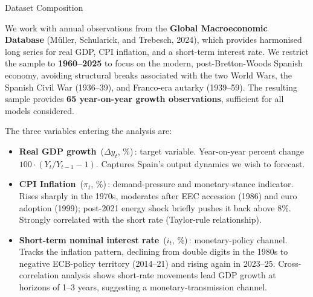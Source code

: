 \documentclass[9pt]{beamer}
\begin{document}
\begin{frame}{Dataset Composition}
\footnotesize

We work with annual observations from the \textbf{Global Macroeconomic Database} (Müller, Schularick, and Trebesch, 2024), which provides harmonised long series for real GDP, CPI inflation, and a short-term interest rate. We restrict the sample to \textbf{1960--2025} to focus on the modern, post-Bretton-Woods Spanish economy, avoiding structural breaks associated with the two World Wars, the Spanish Civil War (1936--39), and Franco-era autarky (1939--59). The resulting sample provides \textbf{65 year-on-year growth observations}, sufficient for all models considered.

\vspace{0.25cm}

The three variables entering the analysis are:
\begin{itemize}
  \item \textbf{Real GDP growth} \,($\Delta y_t$, \%)\,: target variable. Year-on-year percent change $100 \cdot (Y_t/Y_{t-1}-1)$. Captures Spain's output dynamics we wish to forecast.

  \item \textbf{CPI Inflation} \,($\pi_t$, \%)\,: demand-pressure and monetary-stance indicator. Rises sharply in the 1970s, moderates after EEC accession (1986) and euro adoption (1999); post-2021 energy shock briefly pushes it back above 8\%. Strongly correlated with the short rate (Taylor-rule relationship).

  \item \textbf{Short-term nominal interest rate} \,($i_t$, \%)\,: monetary-policy channel. Tracks the inflation pattern, declining from double digits in the 1980s to negative ECB-policy territory (2014--21) and rising again in 2023--25. Cross-correlation analysis shows short-rate movements lead GDP growth at horizons of 1--3 years, suggesting a monetary-transmission channel.
\end{itemize}

\end{frame}
\end{document}
